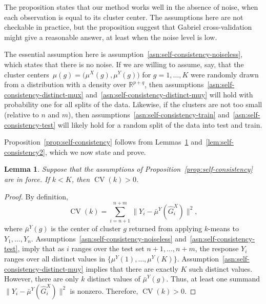 \documentclass[12pt]{article}
\newtheorem{lemma}{Lemma}
\newcommand{\CV}{\operatorname{CV}}
\newcommand{\R}{\mathbb{R}}
\newcommand{\muX}{\mu^{X}}
\newcommand{\muY}{\mu^{Y}}
\newcommand{\bmuY}{\bar \mu^{Y}}
\newcommand{\hGX}{\hat G^{X}}
\begin{document}
The proposition states that our method works well in the absence of noise,
when each observation is equal to its cluster center.  The assumptions here
are not checkable in practice, but the proposition suggest that Gabriel
cross-validation might give a reasonable answer, at least when the noise level
is low.

The essential
assumption here is assumption~\ref{asn:self-consistency-noiseless}, which states
that there is no noise.  If we are willing to assume, say, that the cluster
centers~$\mu(g) = \bigl(\muX(g),\muY(g)\bigr)$ for $g = 1, \dotsc, K$ were
randomly drawn from a distribution with a density over $\R^{p+q}$, then
assumptions~\ref{asn:self-consistency-distinct-mux}
and~\ref{asn:self-consistency-distinct-muy} will hold with probability one for
all splits of the data. Likewise, if the clusters are not too small (relative
to $n$ and $m$), then assumptions~\ref{asn:self-consistency-train}
and~\ref{asn:self-consistency-test} will likely hold for a random split of the
data into test and train.


Proposition~\ref{prop:self-consistency} follows from
Lemmas~\ref{lem:self-consistency1} and~\ref{lem:self-consistency2}, which we
now state and prove.


\begin{lemma}\label{lem:self-consistency1}
Suppose that the assumptions of Proposition~\ref{prop:self-consistency} are in
force.  If $k < K$, then $\CV(k) > 0$.
\end{lemma}
\begin{proof}
By definition,
\[
  \CV(k)
    =
      \sum_{i=n+1}^{n+m}
        \| Y_i - \bmuY (\hGX_i) \|^2,
\]
where $\bmuY(g)$ is the center of cluster $g$ returned from applying $k$-means
to $Y_1, \dotsc, Y_n$.  Assumptions~\ref{asn:self-consistency-noiseless}
and~\ref{asn:self-consistency-test}, imply that as $i$ ranges over the test
set $n+1, \dotsc, n+m$, the response $Y_i$ ranges over all distinct values in
$\{ \muY(1), \dotsc, \muY(K) \}$.
Assumption~\ref{asn:self-consistency-distinct-muy} implies that there are
exactly $K$ such distinct values.  However, there are only $k$ distinct values
of $\bmuY(g)$.  Thus, at least one summand
\(
  \| Y_i - \bmuY(\hGX_i) \|^2
\)
is nonzero.  Therefore,
\(
  \CV(k) > 0.
\)
\end{proof}
\end{document}
